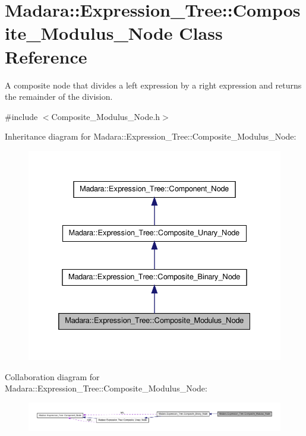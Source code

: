 \hypertarget{classMadara_1_1Expression__Tree_1_1Composite__Modulus__Node}{
\section{Madara::Expression\_\-Tree::Composite\_\-Modulus\_\-Node Class Reference}
\label{df/dfd/classMadara_1_1Expression__Tree_1_1Composite__Modulus__Node}
}


A composite node that divides a left expression by a right expression and returns the remainder of the division.  




{\ttfamily \#include $<$Composite\_\-Modulus\_\-Node.h$>$}



Inheritance diagram for Madara::Expression\_\-Tree::Composite\_\-Modulus\_\-Node:
\nopagebreak
\begin{figure}[H]
\begin{center}
\leavevmode
\includegraphics[width=332pt]{d2/d15/classMadara_1_1Expression__Tree_1_1Composite__Modulus__Node__inherit__graph}
\end{center}
\end{figure}


Collaboration diagram for Madara::Expression\_\-Tree::Composite\_\-Modulus\_\-Node:
\nopagebreak
\begin{figure}[H]
\begin{center}
\leavevmode
\includegraphics[width=400pt]{da/db4/classMadara_1_1Expression__Tree_1_1Composite__Modulus__Node__coll__graph}
\end{center}
\end{figure}
